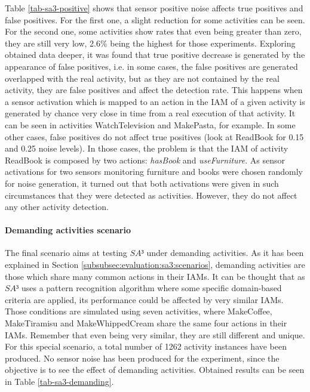 Table \ref{tab-sa3-positive} shows that sensor positive noise affects true positives and false positives. For the first one, a slight reduction for some activities can be seen. For the second one, some activities show rates that even being greater than zero, they are still very low, 2.6\% being the highest for those experiments. Exploring obtained data deeper, it was found that true positive decrease is generated by the appearance of false positives, i.e. in some cases, the false positives are generated overlapped with the real activity, but as they are not contained by the real activity, they are false positives and affect the detection rate. This happens when a sensor activation which is mapped to an action in the IAM of a given activity is generated by chance very close in time from a real execution of that activity. It can be seen in activities WatchTelevision and MakePasta, for example. In some other cases, false positives do not affect true positives (look at ReadBook for 0.15 and 0.25 noise levels). In those cases, the problem is that the IAM of activity ReadBook is composed by two actions: \textit{hasBook} and \textit{useFurniture}. As sensor activations for two sensors monitoring furniture and books were chosen randomly for noise generation, it turned out that both activations were given in such circumstances that they were detected as activities. However, they do not affect any other activity detection.

\paragraph*{Demanding activities scenario}

The final scenario aims at testing $SA³$ under demanding activities. As it has been explained in Section \ref{subsubsec:evaluation:sa3:scenarios}, demanding activities are those which share many common actions in their IAMs. It can be thought that as $SA³$ uses a pattern recognition algorithm where some specific domain-based criteria are applied, its performance could be affected by very similar IAMs. Those conditions are simulated using seven activities, where MakeCoffee, MakeTiramisu and MakeWhippedCream share the same four actions in their IAMs. Remember that even being very similar, they are still different and unique. For this special scenario, a total number of 1262 activity instances have been produced. No sensor noise has been produced for the experiment, since the objective is to see the effect of demanding activities. Obtained results can be seen in Table \ref{tab-sa3-demanding}.

